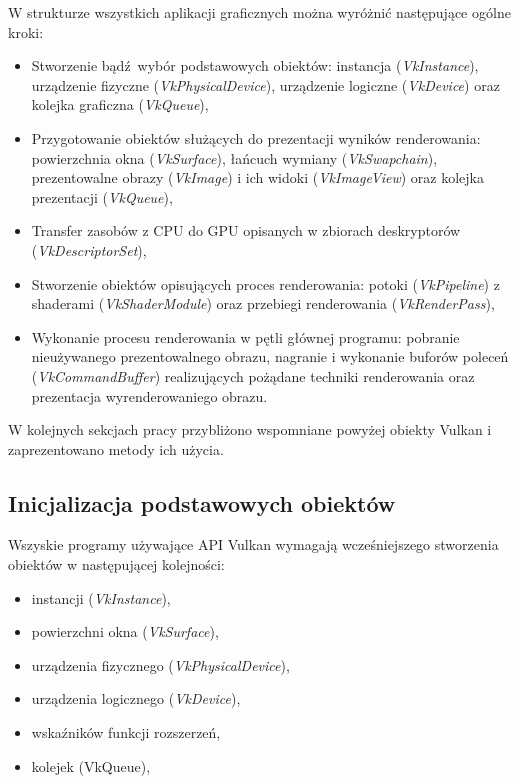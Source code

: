 W strukturze wszystkich aplikacji graficznych można wyróżnić następujące ogólne kroki:
\begin{itemize}
	\item Stworzenie bądź wybór podstawowych obiektów: instancja (\textit{VkInstance}), urządzenie fizyczne (\textit{VkPhysicalDevice}), urządzenie logiczne (\textit{VkDevice}) oraz kolejka graficzna (\textit{VkQueue}),
	\item Przygotowanie obiektów służących do prezentacji wyników renderowania: powierzchnia okna (\textit{VkSurface}), łańcuch wymiany (\textit{VkSwapchain}), prezentowalne obrazy (\textit{VkImage}) i ich widoki (\textit{VkImageView}) oraz kolejka prezentacji (\textit{VkQueue}),
	\item Transfer zasobów z CPU do GPU opisanych w zbiorach deskryptorów (\textit{VkDescriptorSet}),
	\item Stworzenie obiektów opisujących proces renderowania: potoki (\textit{VkPipeline}) z shaderami (\textit{VkShaderModule}) oraz przebiegi renderowania (\textit{VkRenderPass}),
	\item Wykonanie procesu renderowania w pętli głównej programu: pobranie nieużywanego prezentowalnego obrazu, nagranie i wykonanie buforów poleceń (\textit{VkCommandBuffer}) realizujących pożądane techniki renderowania oraz prezentacja wyrenderowaniego obrazu.
\end{itemize}

W kolejnych sekcjach pracy przybliżono wspomniane powyżej obiekty Vulkan i zaprezentowano metody ich użycia.


\subsection{Inicjalizacja podstawowych obiektów}

Wszyskie programy używające API Vulkan wymagają wcześniejszego stworzenia obiektów w następującej kolejności:
\begin{itemize}
	\item instancji (\textit{VkInstance}),
	\item powierzchni okna (\textit{VkSurface}),
	\item urządzenia fizycznego (\textit{VkPhysicalDevice}),
	\item urządzenia logicznego (\textit{VkDevice}),
	\item wskaźników funkcji rozszerzeń,
	\item kolejek (VkQueue),
\end{itemize}

